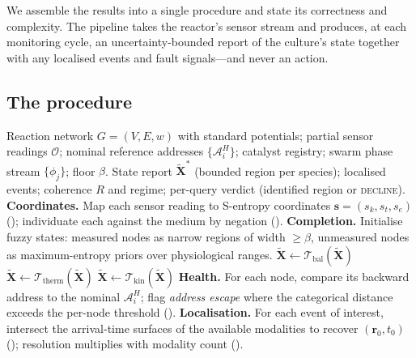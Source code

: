 \documentclass[11pt,twocolumn,a4paper]{article}
\theoremstyle{thmstyle}
\theoremstyle{definition}
\theoremstyle{remark}
\newcommand{\Scoord}{\mathbf{s}}
\newcommand{\Sk}{s_{k}}
\newcommand{\St}{s_{t}}
\newcommand{\Se}{s_{e}}
\newcommand{\floorc}{\beta}
\newcommand{\V}{V}
\newcommand{\E}{E}
\newcommand{\Rens}{R}
\newcommand{\eps}{\varepsilon}
\begin{document}
We assemble the results into a single procedure and state its correctness
and complexity. The pipeline takes the reactor's sensor stream and produces,
at each monitoring cycle, an uncertainty-bounded report of the culture's
state together with any localised events and fault signals---and never an
action.

\subsection{The procedure}

\begin{algorithm}[t]
\caption{Bioreactor Monitoring Cycle}
\label{alg:monitor}
\begin{algorithmic}[1]
\Require Reaction network $G=(\V,\E,w)$ with standard potentials; partial
sensor readings $\mathcal{O}$; nominal reference addresses
$\{\mathcal{A}_i^H\}$; catalyst registry; swarm phase stream
$\{\phi_j\}$; floor $\floorc$.
\Ensure State report $\widetilde{\mathbf X}^\ast$ (bounded region per
species); localised events; coherence $\Rens$ and regime; per-query
verdict (identified region or \textsc{decline}).
\State \textbf{Coordinates.} Map each sensor reading to S-entropy
coordinates $\Scoord=(\Sk,\St,\Se)$ (); individuate each
against the medium by negation ().
\State \textbf{Completion.} Initialise fuzzy states: measured nodes as
narrow regions of width $\ge\floorc$, unmeasured nodes as maximum-entropy
priors over physiological ranges.
\Repeat
   \State $\widetilde{\mathbf X}\gets\mathcal{T}_{\mathrm{bal}}
          (\widetilde{\mathbf X})$
   \State $\widetilde{\mathbf X}\gets\mathcal{T}_{\mathrm{therm}}
          (\widetilde{\mathbf X})$
   \State $\widetilde{\mathbf X}\gets\mathcal{T}_{\mathrm{kin}}
          (\widetilde{\mathbf X})$
\Until{$d(\widetilde{\mathbf X},\widetilde{\mathbf X}_{\mathrm{prev}})
       <\eps$}
\State \textbf{Health.} For each node, compare its backward address to the
nominal $\mathcal{A}_i^H$; flag \emph{address escape} where the categorical
distance exceeds the per-node threshold ().
\State \textbf{Localisation.} For each event of interest, intersect the
arrival-time surfaces of the available modalities to recover
$(\mathbf r_0,t_0)$ (); resolution multiplies with
modality count ().

\end{algorithmic}
\end{algorithm}
\end{document}
